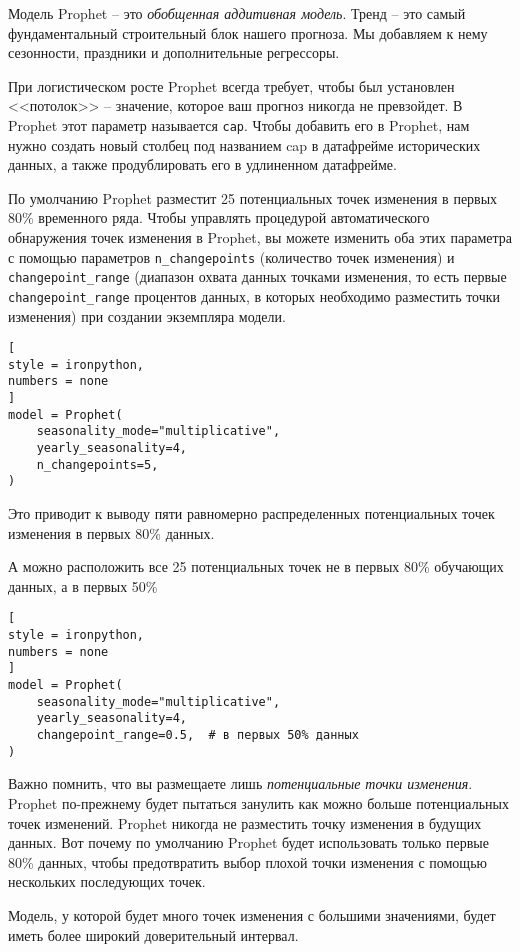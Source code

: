 \documentclass[%
	11pt,
	a4paper,
	utf8,
		]{article}
\begin{document}
Модель Prophet -- это \emph{обобщенная аддитивная модель}. Тренд -- это самый фундаментальный строительный блок нашего прогноза. Мы добавляем к нему сезонности, праздники и дополнительные регрессоры.

При логистическом росте Prophet всегда требует, чтобы был установлен <<потолок>> -- значение, которое ваш прогноз никогда не превзойдет. В Prophet этот параметр называется \verb|cap|. Чтобы добавить его в Prophet, нам нужно создать новый столбец под названием cap в датафрейме исторических данных, а также продублировать его в удлиненном датафрейме.

По умолчанию Prophet разместит 25 потенциальных точек изменения в первых 80\% временного ряда. Чтобы управлять процедурой автоматического обнаружения точек изменения в Prophet, вы можете изменить оба этих параметра с помощью параметров \verb|n_changepoints| (количество точек изменения) и \verb|changepoint_range| (диапазон охвата данных точками изменения, то есть первые \verb|changepoint_range| процентов данных, в которых необходимо разместить точки изменения) при создании экземпляра модели.
\begin{lstlisting}[
style = ironpython,
numbers = none
]
model = Prophet(
    seasonality_mode="multiplicative",
    yearly_seasonality=4,
    n_changepoints=5,
)
\end{lstlisting}

Это приводит к выводу пяти равномерно распределенных потенциальных точек изменения в первых 80\% данных.

А можно расположить все 25 потенциальных точек не в первых 80\% обучающих данных, а в первых 50\%
\begin{lstlisting}[
style = ironpython,
numbers = none
]
model = Prophet(
    seasonality_mode="multiplicative",
    yearly_seasonality=4,
    changepoint_range=0.5,  # в первых 50% данных
)
\end{lstlisting}

Важно помнить, что вы размещаете лишь \emph{потенциальные точки изменения}. Prophet по-прежнему будет пытаться занулить как можно больше потенциальных точек изменений. Prophet никогда не разместить точку изменения в будущих данных. Вот почему по умолчанию Prophet будет использовать только первые 80\% данных, чтобы предотвратить выбор плохой точки изменения с помощью нескольких последующих точек.

Модель, у которой будет много точек изменения с большими значениями, будет иметь более широкий доверительный интервал.
\end{document}
